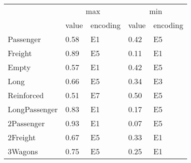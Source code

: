 \begin{tabular}{lllll}
\toprule
 & \multicolumn{2}{c}{max} & \multicolumn{2}{c}{min} \\
 & value & encoding & value & encoding \\
\midrule
Passenger & 0.58 & E1 & 0.42 & E5 \\
Freight & 0.89 & E5 & 0.11 & E1 \\
Empty & 0.57 & E1 & 0.42 & E5 \\
Long & 0.66 & E5 & 0.34 & E3 \\
Reinforced & 0.51 & E7 & 0.50 & E5 \\
LongPassenger & 0.83 & E1 & 0.17 & E5 \\
2Passenger & 0.93 & E1 & 0.07 & E5 \\
2Freight & 0.67 & E5 & 0.33 & E1 \\
3Wagons & 0.75 & E5 & 0.25 & E1 \\
\bottomrule
\end{tabular}
